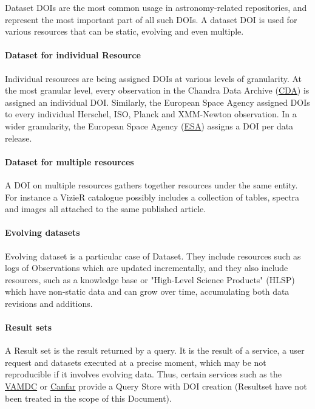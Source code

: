 \documentclass[11pt,a4paper]{ivoa}
\begin{document}
Dataset DOIs are the most common usage in astronomy-related repositories, and represent the most important part of all such DOIs. 
A dataset DOI is used for various resources that can be static, evolving and even multiple.

\paragraph{Dataset for individual Resource}\label{sec:dataset-for-individual-resource}

Individual resources are being assigned DOIs at various levels of granularity. At the most granular level, every observation in the Chandra Data Archive (\href{https://cxc.harvard.edu/cda/}{CDA}) is assigned an individual DOI. Similarly, the European Space Agency assigned DOIs to every individual Herschel, ISO, Planck and XMM-Newton observation. In a wider granularity, the  European Space Agency (\href{https://www.esa.int/}{ESA}) assigns  a DOI per data release.

\paragraph{Dataset for multiple resources}\label{sec:dataset-for-multiple-resources}

A DOI on multiple resources gathers together resources under the same entity. For instance a VizieR catalogue \citep{vizier} possibly includes a collection of tables, spectra and images all attached to the same published article.

\paragraph{Evolving datasets}\label{sec:evolving-datasets}

Evolving dataset is a particular case of Dataset. They include resources such as logs of Observations which are updated incrementally, and they also include resources, such as a knowledge base or "High-Level Science Products" (HLSP) which have non-static data and can grow over time, accumulating both data revisions and additions. %

\paragraph{Result sets}\label{sec:resultsets}

A Result set is the result returned by a query. It is the result of a service, a user request and datasets executed at a precise moment, which may be not reproducible if it involves evolving data. Thus, certain services such as the \href{https://vamdc.org/}{VAMDC} or \href{https://www.canfar.net/}{Canfar} provide a Query Store with DOI creation (Resultset have not been treated in the scope of this Document).
\end{document}
